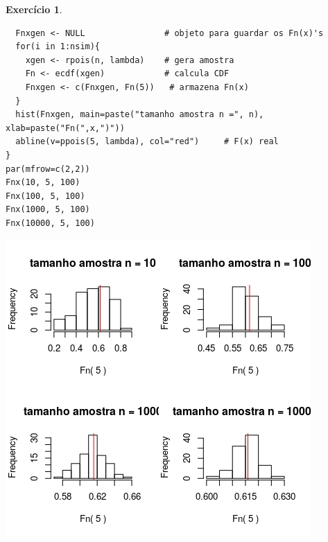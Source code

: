 \documentclass[letter,11pt]{article}
\newtheorem{exer}{Exercício}
\begin{document}
\begin{exer}
\begin{enumerate}[a)]
\begin{verbatim}
  Fnxgen <- NULL                # objeto para guardar os Fn(x)'s
  for(i in 1:nsim){
    xgen <- rpois(n, lambda)    # gera amostra
    Fn <- ecdf(xgen)            # calcula CDF
    Fnxgen <- c(Fnxgen, Fn(5))   # armazena Fn(x)
  }
  hist(Fnxgen, main=paste("tamanho amostra n =", n), xlab=paste("Fn(",x,")"))
  abline(v=ppois(5, lambda), col="red")     # F(x) real
}
par(mfrow=c(2,2))
Fnx(10, 5, 100)
Fnx(100, 5, 100)
Fnx(1000, 5, 100)
Fnx(10000, 5, 100)
  \end{verbatim}
  \includegraphics[scale=0.5]{exe_ecdf3}
\end{enumerate}
\end{exer}
  
\end{document}
